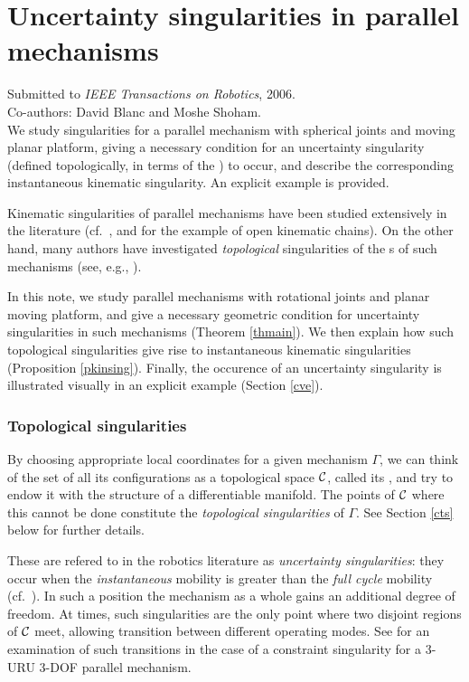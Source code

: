 \chapter{Uncertainty singularities in parallel mechanisms}
\label{chap4}

\textsf{Submitted to \textsl{IEEE Transactions on Robotics}, 2006.} \\
\textsf{Co-authors: David Blanc and Moshe Shoham.}\\

We study singularities for a parallel mechanism with spherical
joints and moving planar platform, giving a necessary condition
for an uncertainty singularity (defined topologically, in terms of
the \cspace) to occur, and describe the corresponding
instantaneous kinematic singularity.  An explicit example is
provided.



 \label{cint}
%
Kinematic singularities of parallel mechanisms have been studied
extensively in the literature (cf.\ \cite{Hu2}, and \cite{Hu1,WW}
for the example of open kinematic chains). On the other hand, many
authors have investigated \emph{topological} singularities of the
\cspace s of such mechanisms (see, e.g., \cite{KM,KT,MT1,SSB05}).

In this note, we study parallel mechanisms with rotational joints and
planar moving platform, and give a necessary
geometric condition  for uncertainty singularities in such mechanisms
(Theorem \ref{thmain}). We then explain how such topological
singularities give rise to instantaneous kinematic singularities
(Proposition \ref{pkinsing}).
Finally, the occurence of an uncertainty singularity is illustrated
visually in an explicit example (Section \ref{cve}).

\subsection{Topological singularities}
\label{sts}
%
By choosing appropriate local coordinates for a given mechanism $\Gamma$, we
can think of the set of all its configurations as a topological space
$\mathcal{C}$, called its \emph{\cspace}, and try to endow it with the
structure of a differentiable manifold. The points of $\mathcal{C}$  where this
cannot be done constitute the \emph{topological singularities} of
$\Gamma$. See Section \ref{cts} below for further details.

These are refered to in the robotics literature as \emph{uncertainty
singularities}: they occur when the \emph{instantaneous} mobility
is greater than the \emph{full cycle} mobility  (cf.\ \cite{Hu2}).
In such a position the mechanism as a whole gains an additional
degree of freedom. At times, such singularities are the only point
where two disjoint regions of $\mathcal{C}$ meet, allowing transition between
different operating modes. See \cite{ZBC} for an examination of such
transitions in the case of a constraint singularity for a $3$-URU
$3$-DOF parallel mechanism.

